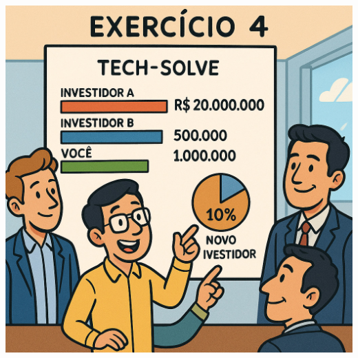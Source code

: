 \documentclass[
]{book}
\begin{document}
\includegraphics[width=7.15625in,height=\textheight]{images/03-2025-08-19_20/exercicio-04.jpg}
\end{document}

